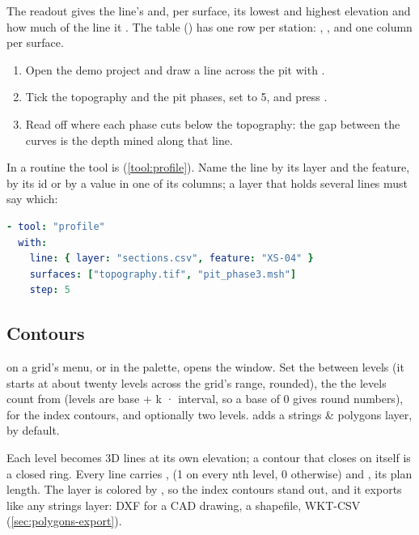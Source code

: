 The readout gives the line's  and, per surface, its lowest and highest elevation and how much of the line it . The table () has one row per station: , ,  and one column per surface.

\begin{tryit}
\begin{enumerate}
\item Open the demo project and draw a line across the pit with .
\item Tick the topography and the pit phases, set  to 5, and press .
\item Read off where each phase cuts below the topography: the gap between the curves is the depth mined along that line.
\end{enumerate}
\end{tryit}

In a routine the tool is  (\cref{tool:profile}). Name the line by its layer and the feature, by its id or by a value in one of its columns; a layer that holds several lines must say which:

\begin{lstlisting}[language=yaml]
- tool: "profile"
  with:
    line: { layer: "sections.csv", feature: "XS-04" }
    surfaces: ["topography.tif", "pit_phase3.msh"]
    step: 5
\end{lstlisting}

\subsection{Contours}\label{sec:grids-contours}
 on a grid's menu, or  in the palette, opens the  window. Set the  between levels (it starts at about twenty levels across the grid's range, rounded), the  the levels count from (levels are base + k · interval, so a base of 0 gives round numbers),  for the index contours, and optionally  two levels.  adds a strings \& polygons layer,  by default.

Each level becomes 3D lines at its own elevation; a contour that closes on itself is a closed ring. Every line carries ,  (1 on every nth level, 0 otherwise) and , its plan length. The layer is colored by , so the index contours stand out, and it exports like any strings layer: DXF for a CAD drawing, a shapefile, WKT-CSV (\cref{sec:polygons-export}).

